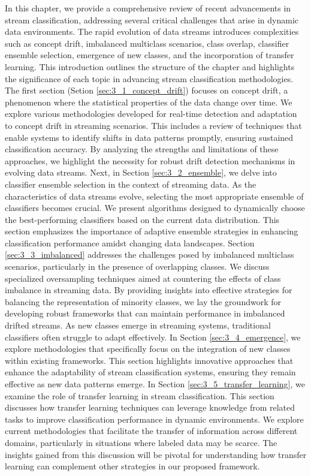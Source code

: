 In this chapter, we provide a comprehensive review of recent advancements in stream classification, addressing several critical challenges that arise in dynamic data environments. The rapid evolution of data streams introduces complexities such as concept drift, imbalanced multiclass scenarios, class overlap, classifier ensemble selection, emergence of new classes, and the incorporation of transfer learning. This introduction outlines the structure of the chapter and highlights the significance of each topic in advancing stream classification methodologies.
The first section (Setion \ref{sec:3_1_concept_drift}) focuses on concept drift, a phenomenon where the statistical properties of the data change over time. We explore various methodologies developed for real-time detection and adaptation to concept drift in streaming scenarios. This includes a review of techniques that enable systems to identify shifts in data patterns promptly, ensuring sustained classification accuracy. By analyzing the strengths and limitations of these approaches, we highlight the necessity for robust drift detection mechanisms in evolving data streams.
Next, in Section \ref{sec:3_2_ensemble}, we delve into classifier ensemble selection in the context of streaming data. As the characteristics of data streams evolve, selecting the most appropriate ensemble of classifiers becomes crucial. We present algorithms designed to dynamically choose the best-performing classifiers based on the current data distribution. This section emphasizes the importance of adaptive ensemble strategies in enhancing classification performance amidst changing data landscapes.
Section \ref{sec:3_3_imbalanced} addresses the challenges posed by imbalanced multiclass scenarios, particularly in the presence of overlapping classes. We discuss specialized oversampling techniques aimed at countering the effects of class imbalance in streaming data. By providing insights into effective strategies for balancing the representation of minority classes, we lay the groundwork for developing robust frameworks that can maintain performance in imbalanced drifted streams.
As new classes emerge in streaming systems, traditional classifiers often struggle to adapt effectively. In Section \ref{sec:3_4_emergence}, we explore methodologies that specifically focus on the integration of new classes within existing frameworks. This section highlights innovative approaches that enhance the adaptability of stream classification systems, ensuring they remain effective as new data patterns emerge.
In Section \ref{sec:3_5_transfer_learning}, we examine the role of transfer learning in stream classification. This section discusses how transfer learning techniques can leverage knowledge from related tasks to improve classification performance in dynamic environments. We explore current methodologies that facilitate the transfer of information across different domains, particularly in situations where labeled data may be scarce. The insights gained from this discussion will be pivotal for understanding how transfer learning can complement other strategies in our proposed framework.
